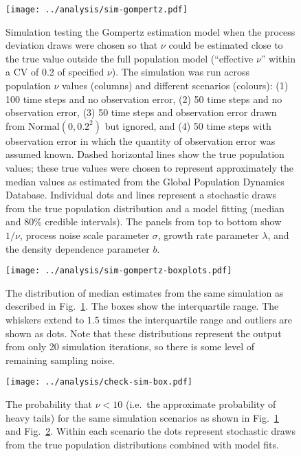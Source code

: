\begin{figure}[htbp]
\begin{center}
\texttt{[image: ../analysis/sim-gompertz.pdf]}
\caption{
  Simulation testing the Gompertz estimation model when the process deviation
  draws were chosen so that $\nu$ could be estimated close to the true value
  outside the full population model (``effective $\nu$'' within a CV of 0.2 of
  specified $\nu$). The simulation was run across population $\nu$ values
  (columns) and different scenarios (colours): (1) 100 time steps and no
  observation error, (2) 50 time steps and no observation error, (3) 50 time
  steps and observation error drawn from $\mathrm{Normal} (0, 0.2^2)$ but
  ignored, and (4) 50 time steps with observation error in which the quantity
  of observation error was assumed known. Dashed horizontal lines show the true
  population values; these true values were chosen to represent approximately
  the median values as estimated from the Global Population Dynamics Database.
  Individual dots and lines
  represent a stochastic draws from the true population distribution and
  a model fitting (median and 80\% credible intervals). The panels from top to
  bottom show $1/\nu$, process noise scale parameter $\sigma$, growth rate
  parameter $\lambda$, and the density dependence parameter $b$.
}
\label{fig:sim-gompertz}
\end{center}
\end{figure}

\begin{figure}[htbp]
\begin{center}
\texttt{[image: ../analysis/sim-gompertz-boxplots.pdf]}
\caption{
  The distribution of median estimates from the same simulation as described in
  Fig.~\ref{fig:sim-gompertz}. The boxes show the interquartile range. The
  whiskers extend to $1.5$ times the interquartile range and outliers are shown
  as dots. Note that these distributions represent the output from only 20
  simulation iterations, so there is some level of remaining sampling noise.
}
\label{fig:sim-gompertz-boxplots}
\end{center}
\end{figure}


\begin{figure}[htbp]
\begin{center}
\texttt{[image: ../analysis/check-sim-box.pdf]}
\caption{
  The probability that $\nu < 10$ (i.e.\ the approximate probability of heavy
  tails) for the same simulation scenarios as shown in
  Fig.~\ref{fig:sim-gompertz} and Fig.~\ref{fig:sim-gompertz-boxplots}. Within
  each scenario the dots represent stochastic draws from the true population
  distributions combined with model fits.
}
\label{fig:sim-prob}
\end{center}
\end{figure}



